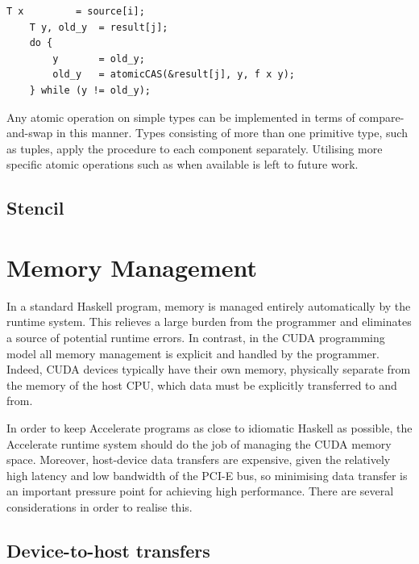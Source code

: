 \begin{lstlisting}[style=cuda]
    T x         = source[i];
    T y, old_y  = result[j];
    do {
        y       = old_y;
        old_y   = atomicCAS(&result[j], y, f x y);
    } while (y != old_y);
\end{lstlisting}
%
Any atomic operation on simple types can be implemented in terms of
compare-and-swap in this manner. Types consisting of more than one primitive
type, such as tuples, apply the procedure to each component separately.
Utilising more specific atomic operations such as  when
available is left to future work.

\subsection{Stencil}


\section{Memory Management}

In a standard Haskell program, memory is managed entirely automatically by the
runtime system. This relieves a large burden from the programmer and eliminates
a source of potential runtime errors. In contrast, in the CUDA programming model
all memory management is explicit and handled by the programmer. Indeed, CUDA
devices typically have their own memory, physically separate from the memory of
the host CPU, which data must be explicitly transferred to and from.

In order to keep Accelerate programs as close to idiomatic Haskell as possible,
the Accelerate runtime system should do the job of managing the CUDA memory
space. Moreover, host-device data transfers are expensive, given the relatively
high latency and low bandwidth of the PCI-E bus, so minimising data transfer is
an important pressure point for achieving high performance. There are several
considerations in order to realise this.



\subsection{Device-to-host transfers}

